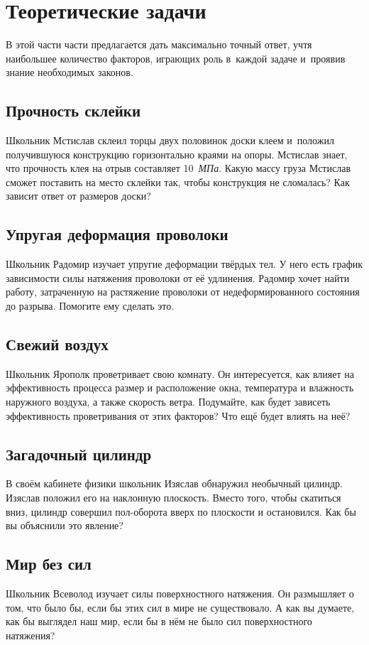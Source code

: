 \documentclass[a4paper,12pt]{article}
\begin{document}
\section{Теоретические задачи}

В этой части части предлагается
дать максимально точный ответ, учтя наибольшее количество факторов, играющих роль в~каждой
задаче и~проявив знание необходимых законов.

\subsection{Прочность склейки}
Школьник Мстислав склеил торцы двух половинок доски клеем и~положил получившуюся конструкцию
горизонтально краями на опоры. Мстислав знает, что прочность клея на отрыв составляет 10~\emph{МПа}.
Какую массу груза Мстислав сможет поставить на место склейки так, чтобы конструкция не сломалась?
Как зависит ответ от размеров доски?

\subsection{Упругая деформация проволоки}
Школьник Радомир изучает упругие деформации твёрдых тел. У него есть график зависимости силы
натяжения проволоки от её удлинения. Радомир хочет найти работу, затраченную на растяжение
проволоки от недеформированного состояния до разрыва. Помогите ему сделать это.

\subsection{Свежий воздух}
Школьник Ярополк проветривает свою комнату. Он интересуется, как влияет на эффективность процесса
размер и расположение окна, температура и влажность наружного воздуха, а также скорость ветра.
Подумайте, как будет зависеть эффективность проветривания от этих факторов?
Что ещё будет влиять на неё?

\subsection{Загадочный цилиндр}
В своём кабинете физики школьник Изяслав обнаружил необычный цилиндр.
Изяслав положил его на наклонную плоскость. Вместо того, чтобы скатиться вниз,
цилиндр совершил пол-оборота вверх по плоскости и остановился.
Как бы вы объяснили это явление?

\subsection{Мир без сил}
Школьник Всеволод изучает силы поверхностного натяжения. Он размышляет о том, что было бы,
если бы этих сил в мире не существовало. А как вы думаете, как бы выглядел наш мир,
если бы в нём не было сил поверхностного натяжения?
\end{document}
